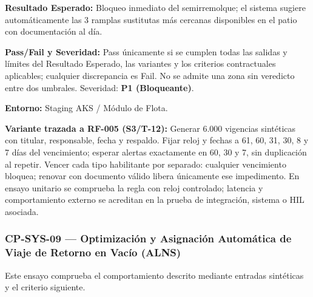 \par\noindent\textbf{Resultado Esperado:} Bloqueo inmediato del semirremolque; el sistema sugiere automáticamente las 3 ramplas sustitutas más cercanas disponibles en el patio con documentación al día.\par
\par\noindent\textbf{Pass/Fail y Severidad:} Pass únicamente si se cumplen todas las salidas y límites del Resultado Esperado, las variantes y los criterios contractuales aplicables; cualquier discrepancia es Fail. No se admite una zona sin veredicto entre dos umbrales. Severidad: \textbf{P1 (Bloqueante)}.\par
\par\noindent\textbf{Entorno:} Staging AKS / Módulo de Flota.\par







\par\noindent\textbf{Variante trazada a RF-005 (S3/T-12):} Generar 6.000 vigencias sintéticas con titular, responsable, fecha y respaldo. Fijar reloj y fechas a 61, 60, 31, 30, 8 y 7 días del vencimiento; esperar alertas exactamente en 60, 30 y 7, sin duplicación al repetir. Vencer cada tipo habilitante por separado: cualquier vencimiento bloquea; renovar con documento válido libera únicamente ese impedimento. En ensayo unitario se comprueba la regla con reloj controlado; latencia y comportamiento externo se acreditan en la prueba de integración, sistema o HIL asociada.\par
\subsubsection*{CP-SYS-09 — Optimización y Asignación Automática de Viaje de Retorno en Vacío (ALNS)}\label{sec:9-cp-sys-09}
Este ensayo comprueba el comportamiento descrito mediante entradas sintéticas y el criterio siguiente.

